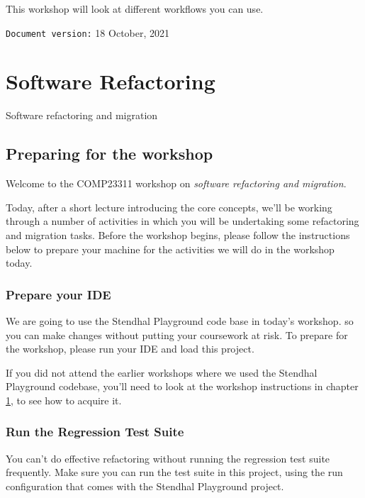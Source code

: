 \documentclass[
]{book}
\begin{document}
This workshop will look at different workflows you can use.

\texttt{Document\ version:} 18 October, 2021

\hypertarget{refactoring}{%
\chapter{Software Refactoring}\label{refactoring}}

Software refactoring and migration

\hypertarget{gitprep}{%
\section{Preparing for the workshop}\label{gitprep}}

Welcome to the COMP23311 workshop on \emph{software refactoring and migration}.

Today, after a short lecture introducing the core concepts, we'll be working through a number of activities in which you will be undertaking some refactoring and migration tasks. Before the workshop begins, please follow the instructions below to prepare your machine for the activities we will do in the workshop today.

\hypertarget{prepide}{%
\subsection{Prepare your IDE}\label{prepide}}

We are going to use the Stendhal Playground code base in today's workshop. so you can make changes without putting your coursework at risk. To prepare for the workshop, please run your IDE and load this project.

If you did not attend the earlier workshops where we used the Stendhal Playground codebase, you'll need to look at the workshop instructions in chapter \ref{refactoring}, to see how to acquire it.

\hypertarget{testsuite}{%
\subsection{Run the Regression Test Suite}\label{testsuite}}

You can't do effective refactoring without running the regression test suite frequently. Make sure you can run the test suite in this project, using the run configuration that comes with the Stendhal Playground project.
\end{document}
